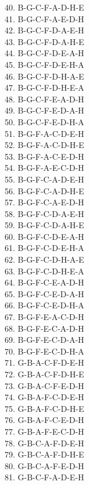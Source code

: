 \documentclass[10pt]{article}
\begin{document}
40. B-G-C-F-A-D-H-E \\
41. B-G-C-F-A-E-D-H \\
42. B-G-C-F-D-A-E-H \\
43. B-G-C-F-D-A-H-E \\
44. B-G-C-F-D-E-A-H \\
45. B-G-C-F-D-E-H-A \\
46. B-G-C-F-D-H-A-E \\
47. B-G-C-F-D-H-E-A \\
48. B-G-C-F-E-A-D-H \\
49. B-G-C-F-E-D-A-H \\
50. B-G-C-F-E-D-H-A \\
51. B-G-F-A-C-D-E-H \\
52. B-G-F-A-C-D-H-E \\
53. B-G-F-A-C-E-D-H \\
54. B-G-F-A-E-C-D-H \\
55. B-G-F-C-A-D-E-H \\
56. B-G-F-C-A-D-H-E \\
57. B-G-F-C-A-E-D-H \\
58. B-G-F-C-D-A-E-H \\
59. B-G-F-C-D-A-H-E \\
60. B-G-F-C-D-E-A-H \\
61. B-G-F-C-D-E-H-A \\
62. B-G-F-C-D-H-A-E \\
63. B-G-F-C-D-H-E-A \\
64. B-G-F-C-E-A-D-H \\
65. B-G-F-C-E-D-A-H \\
66. B-G-F-C-E-D-H-A \\
67. B-G-F-E-A-C-D-H \\
68. B-G-F-E-C-A-D-H \\
69. B-G-F-E-C-D-A-H \\
70. B-G-F-E-C-D-H-A \\
71. G-B-A-C-F-D-E-H \\
72. G-B-A-C-F-D-H-E \\
73. G-B-A-C-F-E-D-H \\
74. G-B-A-F-C-D-E-H \\
75. G-B-A-F-C-D-H-E \\
76. G-B-A-F-C-E-D-H \\
77. G-B-A-F-E-C-D-H \\
78. G-B-C-A-F-D-E-H \\
79. G-B-C-A-F-D-H-E \\
80. G-B-C-A-F-E-D-H \\
81. G-B-C-F-A-D-E-H \\
\end{document}
